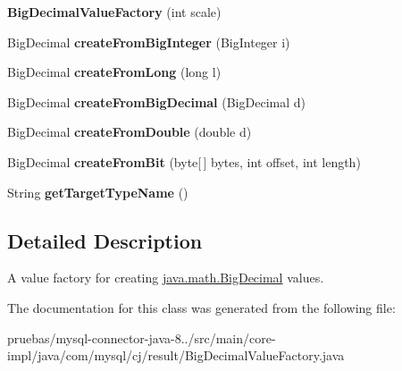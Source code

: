 \begin{DoxyCompactItemize}
\item 
\mbox{\label{classcom_1_1mysql_1_1cj_1_1result_1_1_big_decimal_value_factory_a2ca9b1d72c0356fd25d82132f8c83210}} 
{\bfseries Big\+Decimal\+Value\+Factory} (int scale)
\item 
\mbox{\label{classcom_1_1mysql_1_1cj_1_1result_1_1_big_decimal_value_factory_a4ad58a8fd9228cf82aa94326cfdca887}} 
Big\+Decimal {\bfseries create\+From\+Big\+Integer} (Big\+Integer i)
\item 
\mbox{\label{classcom_1_1mysql_1_1cj_1_1result_1_1_big_decimal_value_factory_a2a40c1118f2a5ca90c75772ac764f20b}} 
Big\+Decimal {\bfseries create\+From\+Long} (long l)
\item 
\mbox{\label{classcom_1_1mysql_1_1cj_1_1result_1_1_big_decimal_value_factory_aa414a1622fd81d3ebcbbebd2fb339038}} 
Big\+Decimal {\bfseries create\+From\+Big\+Decimal} (Big\+Decimal d)
\item 
\mbox{\label{classcom_1_1mysql_1_1cj_1_1result_1_1_big_decimal_value_factory_a28ef726d00bb68aa0b42e511210179a2}} 
Big\+Decimal {\bfseries create\+From\+Double} (double d)
\item 
\mbox{\label{classcom_1_1mysql_1_1cj_1_1result_1_1_big_decimal_value_factory_a64bfb50c290e4a90430913941ad66414}} 
Big\+Decimal {\bfseries create\+From\+Bit} (byte\mbox{[}$\,$\mbox{]} bytes, int offset, int length)
\item 
\mbox{\label{classcom_1_1mysql_1_1cj_1_1result_1_1_big_decimal_value_factory_a1d7ae8a6ba7ab702d6bc4a30c9f66bd5}} 
String {\bfseries get\+Target\+Type\+Name} ()
\end{DoxyCompactItemize}


\subsection{Detailed Description}
A value factory for creating \mbox{\hyperlink{}{java.\+math.\+Big\+Decimal}} values. 

The documentation for this class was generated from the following file\+:\begin{DoxyCompactItemize}
\item 
pruebas/mysql-\/connector-\/java-\/8../src/main/core-\/impl/java/com/mysql/cj/result/Big\+Decimal\+Value\+Factory.\+java\end{DoxyCompactItemize}
